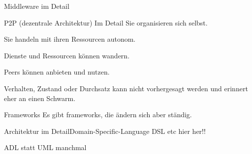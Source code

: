 \documentclass{beamer}
\begin{document}
\begin{frame}
		Middleware im Detail

		P2P (dezentrale Architektur) Im Detail
		    Sie organisieren sich selbst.

    Sie handeln mit ihren Ressourcen autonom.

    Dienste und Ressourcen können wandern.

    Peers können anbieten und nutzen.

    Verhalten, Zustand oder Durchsatz kann nicht vorhergesagt werden und erinnert eher an einen Schwarm.
\end{frame}

\begin{frame}{Frameworks}
	Es gibt frameworks, die ändern sich aber ständig.
\end{frame}

\begin{frame}
\end{frame}

\begin{frame}{Architektur im Detail}{Domain-Specific-Language}
	DSL etc hier her!!
\end{frame}

\begin{frame}
	ADL statt UML manchmal
\end{frame}





\end{document}

